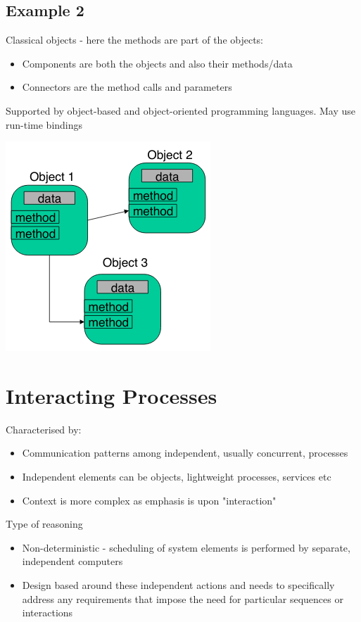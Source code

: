 \documentclass{article}[18pt]
\begin{document}
\subsection{Example 2}
Classical objects - here the methods are part of the objects:
\begin{itemize}
	\item Components are both the objects and also their methods/data
	\item Connectors are the method calls and parameters
\end{itemize}
Supported by object-based and object-oriented programming languages. May use run-time bindings
\begin{center}
	\includegraphics[scale=0.7]{"Call and Return1"}
\end{center}
\section{Interacting Processes}
Characterised by:
\begin{itemize}
	\item Communication patterns among independent, usually concurrent, processes
	\item Independent elements can be objects, lightweight processes, services etc
	\item Context is more complex as emphasis is upon "interaction"
\end{itemize}
Type of reasoning
\begin{itemize}
	\item Non-deterministic - scheduling of system elements is performed by separate, independent computers
	\item Design based around these independent actions and needs to specifically address any requirements that impose the need for particular sequences or interactions
\end{itemize}
\end{document}
